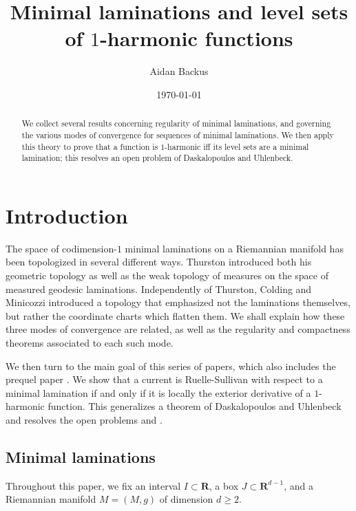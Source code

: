 \documentclass[reqno,11pt]{amsart}
\title{Minimal laminations and level sets of $1$-harmonic functions}
\author{Aidan Backus}
\date{\today}
\newcommand{\RR}{\mathbf{R}}
\theoremstyle{definition}
\numberwithin{equation}{section}
\begin{document}
\begin{abstract}
We collect several results concerning regularity of minimal laminations, and governing the various modes of convergence for sequences of minimal laminations.
We then apply this theory to prove that a function is $1$-harmonic iff its level sets are a minimal lamination; this resolves an open problem of Daskalopoulos and Uhlenbeck.
\end{abstract}

\maketitle



\section{Introduction}
The space of codimension-$1$ minimal laminations on a Riemannian manifold has been topologized in several different ways.
Thurston \cite[Chapter 8]{thurston1979geometry} introduced both his geometric topology as well as the weak topology of measures on the space of measured geodesic laminations.
Independently of Thurston, Colding and Minicozzi \cite[Appendix B]{ColdingMinicozziIV} introduced a topology that emphasized not the laminations themselves, but rather the coordinate charts which flatten them.
We shall explain how these three modes of convergence are related, as well as the regularity and compactness theorems associated to each such mode.

We then turn to the main goal of this series of papers, which also includes the prequel paper \cite{BackusFLG}.
We show that a current is Ruelle-Sullivan with respect to a minimal lamination if and only if it is locally the exterior derivative of a $1$-harmonic function.
This generalizes a theorem of Daskalopoulos and Uhlenbeck \cite[Theorem 6.1]{daskalopoulos2020transverse} and resolves the open problems \cite[Problem 9.4]{daskalopoulos2020transverse} and \cite[Conjecture 9.5]{daskalopoulos2020transverse}.

\subsection{Minimal laminations}\label{Lams sections}
Throughout this paper, we fix an interval $I \subset \RR$, a box $J \subset \RR^{d - 1}$, and a Riemannian manifold $M = (M, g)$ of dimension $d \geq 2$.
\end{document}

